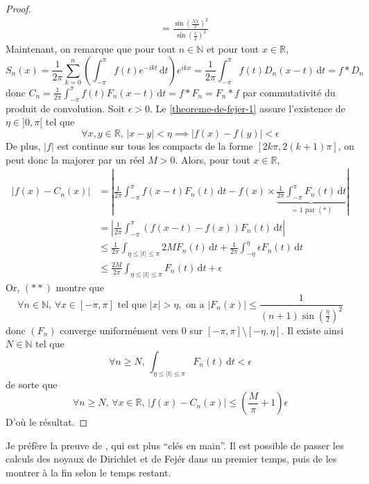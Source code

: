 \begin{proof}
\begin{align*}
      &=\frac{\sin \left( \frac{Nx}{2} \right)^2}{\sin \left ( \frac{x}{2} \right)^2} \tag{$**$}
    \end{align*}
    Maintenant, on remarque que pour tout $n \in \mathbb{N}$ et pour tout $x \in \mathbb{R}$,
    \[ S_n(x) = \frac{1}{2\pi} \sum_{k=0}^n \left( \int_{-\pi}^{\pi} f(t) e^{-ikt} \, \mathrm{d}t \right) e^{ikx} = \frac{1}{2\pi} \int_{-\pi}^{\pi} f(t) D_n(x-t) \, \mathrm{d}t = f * D_n \]
    donc $C_n = \frac{1}{2\pi} \int_{-\pi}^{\pi} f(t) F_n(x-t) \, \mathrm{d}t = f * F_n = F_n * f$ par commutativité du produit de convolution. Soit $\epsilon > 0$. Le \cref{theoreme-de-fejer-1} assure l'existence de $\eta \in ]0, \pi[$ tel que
    \[ \forall x, y \in \mathbb{R}, \, \vert x - y \vert < \eta \implies \vert f(x) - f(y) \vert < \epsilon \]
    De plus, $\vert f \vert$ est continue sur tous les compacts de la forme $[2k\pi, 2(k+1)\pi]$, on peut donc la majorer par un réel $M > 0$. Alors, pour tout $x \in \mathbb{R}$,
    \begin{align*}
      \vert f(x) - C_n(x) \vert &= \left\vert \frac{1}{2\pi} \int_{-\pi}^{\pi} f(x-t) F_n(t) \, \mathrm{d}t - f(x) \times \underbrace{\frac{1}{2\pi} \int_{-\pi}^{\pi} F_n(t) \, \mathrm{d}t}_{= 1 \text{ par } (*)} \right\vert \\
      &= \left\vert \frac{1}{2\pi} \int_{-\pi}^{\pi} (f(x-t) - f(x)) F_n(t) \, \mathrm{d}t \right\vert \\
      &\leq \frac{1}{2\pi} \int_{\eta \leq \vert t \vert \leq \pi} 2MF_n(t) \, \mathrm{d}t + \frac{1}{2\pi} \int_{-\eta}^{\eta} \epsilon F_n(t) \, \mathrm{d}t \\
      &\leq \frac{2M}{2\pi} \int_{\eta \leq \vert t \vert \leq \pi} F_n(t) \, \mathrm{d}t + \epsilon
    \end{align*}
    Or, $(**)$ montre que
    \[ \forall n \in \mathbb{N}, \, \forall x \in [-\pi, \pi] \text{ tel que } \vert x \vert > \eta, \text{ on a } \vert F_n(x) \vert \leq \frac{1}{(n+1) \sin\left( \frac{\eta}{2} \right)^2} \]
    donc $(F_n)$ converge uniformément vers $0$ sur $[-\pi, \pi] \setminus [-\eta, \eta]$. Il existe ainsi $N \in \mathbb{N}$ tel que
    \[ \forall n \geq N, \, \int_{\eta \leq \vert t \vert \leq \pi} F_n(t) \, \mathrm{d}t < \epsilon \]
    de sorte que
    \[ \forall n \geq N, \, \forall x \in \mathbb{R}, \, \vert f(x) - C_n(x) \vert \leq \left(\frac{M}{\pi} + 1\right) \epsilon \]
    D'où le résultat.
  \end{proof}

  Je préfère la preuve de \cite{[GOU21]}, qui est plus ``clés en main''. Il est possible de passer les calculs des noyaux de Dirichlet et de Fejér dans un premier temps, puis de les montrer à la fin selon le temps restant.

